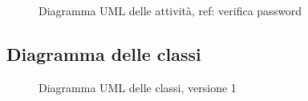 \vspace{0.5cm}
\begin{figure}[H]
    \centering
    \caption{Diagramma UML delle attività, ref: verifica password}
    \label{fig:activity_user_login}
\end{figure}

\pagebreak
\subsection{Diagramma delle classi}
\vspace{0.5cm}
\begin{figure}[H]
    \centering
    \caption{Diagramma UML delle classi, versione 1}
    \label{fig:class_v_1}
\end{figure}

